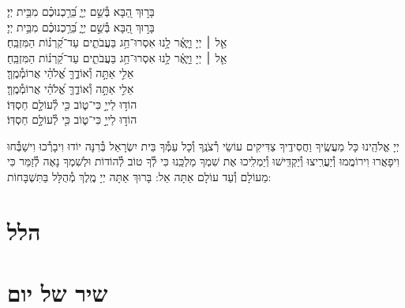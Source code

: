 \documentclass[twoside, openany, parskip=half, 11pt]{book}
\begin{document}
{בָּר֣וּךְ הַ֭בָּא בְּ֯שֵׁ֣ם יְיָ֑ בֵּ֝רַ֥כְנוּכֶ֗ם מִבֵּ֥ית יְיָ׃\\
\scriptsize{בָּר֣וּךְ הַ֭בָּא בְּ֯שֵׁ֣ם יְיָ֑ בֵּ֝רַ֥כְנוּכֶ֗ם מִבֵּ֥ית יְיָ׃}\\
\normalsize{אֵ֤ל ׀ יְיָ וַיָּ֢אֶ֫ר לָ֥נוּ אִסְרוּ־חַ֥ג בַּעֲבֹתִ֑ים עַד־קַ֝רְנ֗וֹת הַמִּזְבֵּֽחַ׃}\\
\scriptsize{אֵ֤ל ׀ יְיָ וַיָּ֢אֶ֫ר לָ֥נוּ אִסְרוּ־חַ֥ג בַּעֲבֹתִ֑ים עַד־קַ֝רְנ֗וֹת הַמִּזְבֵּֽחַ׃}\\
\normalsize{אֵלִ֣י אַתָּ֣ה וְ֯אוֹדֶ֑ךָּ אֱ֝לֹהַ֗י אֲרוֹמְ֯מֶֽךָּ׃}\\
\scriptsize{אֵלִ֣י אַתָּ֣ה וְ֯אוֹדֶ֑ךָּ אֱ֝לֹהַ֗י אֲרוֹמְ֯מֶֽךָּ׃}\\
\normalsize{הוֹד֣וּ לַייָ֣ כִּי־ט֑וֹב כִּ֖י לְ֯עוֹלָ֣ם חַסְדּֽוֹ׃ }\\
\scriptsize{הוֹד֣וּ לַייָ֣ כִּי־ט֑וֹב כִּ֖י לְ֯עוֹלָ֣ם חַסְדּֽוֹ׃ } \\
\normalsize{}



\negline

יְיָ אֱלֹהֵֽינוּ כָּל מַעֲשֶֽׂיךָ וַחֲסִידֶֽיךָ צַדִּיקִים עוֹשֵׂי רְ֯צֹנֶֽךָ וְ֯כָל עַמְּ֯ךָ בֵּית יִשְׂרָאֵל בְּ֯רִנָּה יוֹדוּ וִיבָרְ֯כוּ וִישַׁבְּ֯חוּ וִיפָאֲרוּ וִירוֹמֲמוּ וְ֯יַעֲרִֽיצוּ וְ֯יַקְדִּֽישׁוּ וְ֯יַמְלִֽיכוּ אֶת שִׁמְךָ מַלְכֵּֽנוּ כִּי לְ֯ךָ טוֹב לְ֯הוֹדוֹת וּלְשִׁמְךָ נָאֶה לְ֯זַמֵּר כִּי מֵעוֹלָם וְ֯עַד עוֹלָם אַתָּה אֵל: בָּרוּךְ אַתָּה יְיָ מֶֽלֶךְ מְ֯הֻלָּל בַּתִּשְׁבָּחוֹת:
}

\label{hallel}
\section[הלל‎]{ הלל‎ }
\hallel{\shatz}


\vfill

\fullkaddish
\section[שיר של יום]{ שיר של יום‎ }
\weekdayshir
\label{shirshabbat}
\end{document}
